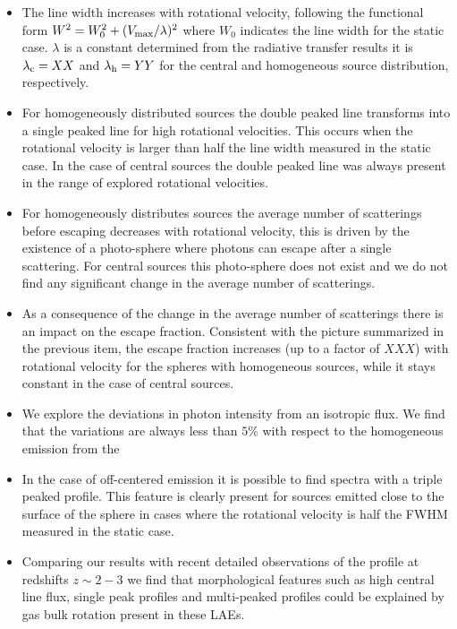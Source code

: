 \documentclass{emulateapj}
\newcommand{\ly}{{\ifmmode{{\rm Ly}\alpha~}\else{Ly$\alpha$~}\fi}}
\begin{document}
\begin{itemize}

\item The line width increases with rotational velocity, following the
  functional form $W^2 = W_{0}^2 + (V_{\rm max}/\lambda)^2$ where
  $W_{0}$ indicates the line width for the static case. $\lambda$ is a
  constant determined from the radiative transfer results it is
  $\lambda_{\rm c}=XX$ and $\lambda_{\rm h}=YY$ for the central and
  homogeneous source distribution, respectively.


\item For homogeneously distributed sources the double peaked line
  transforms into a single peaked line for high rotational
  velocities. This occurs when the rotational velocity is larger than half the
  line width measured in the static case. In the case of central
  sources the double peaked line was always present in the range of
  explored rotational velocities.

\item For homogeneously distributes sources the average number of
  scatterings before escaping decreases with rotational velocity, this
  is driven by the existence of a photo-sphere where photons can
  escape after a single scattering. For central sources this
  photo-sphere does not exist and we do not find any significant
  change in the average number of scatterings.

\item As a consequence of the change in the average number of
  scatterings there is an impact on the escape fraction. Consistent
  with the picture summarized in the previous item, the escape
  fraction increases (up to a factor of $XXX$) with rotational
  velocity for the spheres with homogeneous sources, while it stays
  constant in the case of central sources.

\item We explore the deviations in photon intensity from an isotropic
  flux. We find that the variations are always less than $5\%$ with
  respect to the homogeneous emission from the 

\item In the case of off-centered emission it is possible to find
  spectra with a triple peaked profile. This feature is clearly present for
  sources emitted close to the surface of the sphere in cases where
  the rotational velocity is half the FWHM measured in the static case.


\item Comparing our results with recent detailed observations of the
  \ly profile at redshifts $z\sim 2-3$ we find that morphological
  features such as high central line flux, single peak profiles and
  multi-peaked profiles could be explained by gas bulk  rotation
  present in these LAEs. 
\end{itemize}
\end{document}
